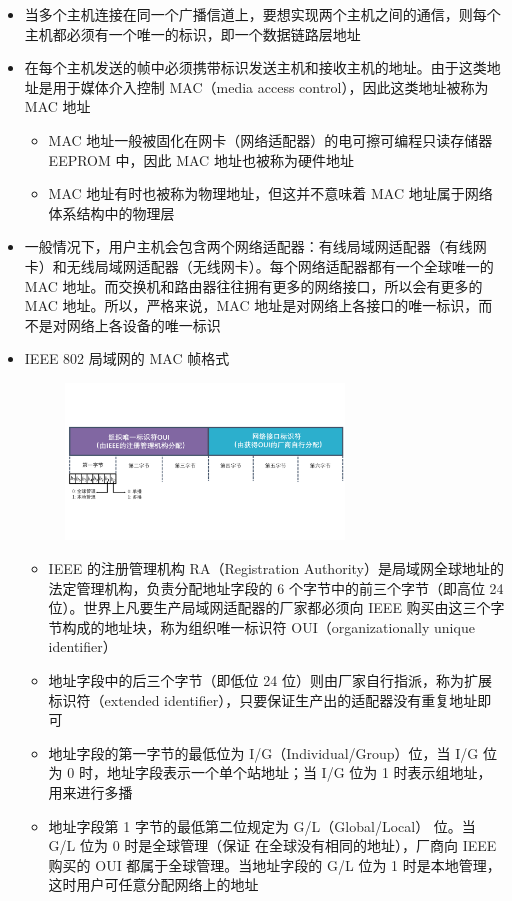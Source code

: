 \documentclass[cs4size,a4paper,10pt]{ctexart}
\begin{document}
	\begin{itemize}
		\item 当多个主机连接在同一个广播信道上，要想实现两个主机之间的通信，则每个主机都必须有一个唯一的标识，即一个数据链路层地址
		\item 在每个主机发送的帧中必须携带标识发送主机和接收主机的地址。由于这类地址是用于媒体介入控制 MAC（media access control），因此这类地址被称为 MAC 地址
		\begin{itemize}
			\item MAC 地址一般被固化在网卡（网络适配器）的电可擦可编程只读存储器 EEPROM 中，因此 MAC 地址也被称为硬件地址
			\item MAC 地址有时也被称为物理地址，但这并不意味着 MAC 地址属于网络体系结构中的物理层
		\end{itemize}
		\item 一般情况下，用户主机会包含两个网络适配器：有线局域网适配器（有线网卡）和无线局域网适配器（无线网卡）。每个网络适配器都有一个全球唯一的 MAC 地址。而交换机和路由器往往拥有更多的网络接口，所以会有更多的 MAC 地址。所以，严格来说，MAC 地址是对网络上各接口的唯一标识，而不是对网络上各设备的唯一标识
		\item IEEE 802 局域网的 MAC 帧格式
		\begin{figure}[H]
			\centering
			\includegraphics[width=0.7\textwidth]{img/3.4.5.1}
		\end{figure}
		\begin{itemize}
			\item IEEE 的注册管理机构 RA（Registration Authority）是局域网全球地址的法定管理机构，负责分配地址字段的 6 个字节中的前三个字节（即高位 24 位）。世界上凡要生产局域网适配器的厂家都必须向 IEEE 购买由这三个字节构成的地址块，称为组织唯一标识符 OUI（organizationally unique identifier）
			\item 地址字段中的后三个字节（即低位 24 位）则由厂家自行指派，称为扩展标识符（extended identifier），只要保证生产出的适配器没有重复地址即可
			\item 地址字段的第一字节的最低位为 I/G（Individual/Group）位，当 I/G 位为 0 时，地址字段表示一个单个站地址；当 I/G 位为 1 时表示组地址，用来进行多播
			\item 地址字段第 1 字节的最低第二位规定为 G/L（Global/Local） 位。当 G/L 位为 0 时是全球管理（保证 在全球没有相同的地址），厂商向 IEEE 购买的 OUI 都属于全球管理。当地址字段的 G/L 位为 1 时是本地管理，这时用户可任意分配网络上的地址
		\end{itemize}
	\end{itemize}
\end{document}
